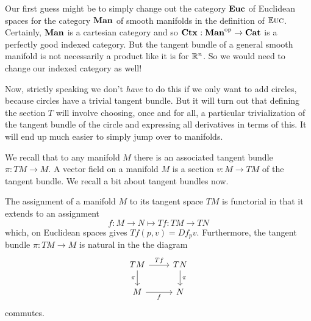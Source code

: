 \documentclass[DynamicalBook]{subfiles}
\begin{document}
Our first guess might be to simply change out the category $\textbf{Euc}$ of
Euclidean spaces for the category $\textbf{Man}$ of smooth manifolds in the
definition of $\mathbb{E}\textsc{uc}$. Certainly, $\textbf{Man}$ is a cartesian category and so
$\textbf{Ctx}_{} : \textbf{Man}^{\textnormal{op}} \to \textbf{Cat}$ is a perfectly good indexed category.
But the tangent bundle of a general smooth manifold is not necessarily a product
like it is for $\mathbb{R}^n$. So we would need to change our indexed category as well!

\iffalse
We could certainly do this, but if we only want to add circles then we can do
something less drastic. We can consider the cartesian category whose objects are
of the form $\rr^n \times T^m$, where $T^m = S^1 \times \cdots \times S^1$ is
the $m$-fold torus, and whose maps are smooth maps. Since the circle is
\emph{parallelizable}, which is to say that one can define a vector field on the
circle as a function in $\rr$, the tangent bundle of $\rr^n \times T^m$ is a
product of this space with $\rr^{n + m}$. 

\begin{definition}
  Let $\Cat{Tori}$ denote the category whose objects are $\rr^n \times T^m$ and
  smooth maps between them. We note that this is a cartesian category, with
  $$(\rr^n \times T^m) \times (\rr^k \times T^q) = \rr^{n + k} \times T^{m + q}.$$
\end{definition}

\begin{definition}
 The \emph{toric differential doctrine} consists of $\smctx{-} : \Cat{Tori}\op
 \to \Cat{Cat}$ together with the section $T$ given by $T(\rr^n \times T^m) =
 \rr^{n + m}$ and for $f : \rr^n \times T^m \to \rr^k \times T^q$, $Tf : (\rr^n
 \times T^m) \times \rr^{n + m} \to \rr^k \times T^q$ defined to be
 \[
Tf((p,t),(v, u)) \coloneqq ()
 \]
\end{definition}
\fi

Now, strictly speaking we don't \emph{have} to do this if we only want to add
circles, because circles have a trivial tangent bundle. But it will turn out
that defining the section $T$ will involve choosing, once and for all, a
particular trivialization of the tangent bundle of the circle and expressing all
derivatives in terms of this. It will end up much easier to simply jump over to manifolds.

We recall that to any manifold $M$ there is an associated tangent bundle $\pi :
TM \to M$. A vector field on a manifold $M$ is a section $v : M \to TM$ of the
tangent bundle. We recall a bit about tangent bundles now.
\begin{proposition}
The assignment of a manifold $M$ to its tangent space $TM$ is functorial in that
it extends to an assignment
\[
f : M \to N \mapsto Tf : TM \to TN
\]
which, on Euclidean spaces gives $Tf(p, v) = Df_p v$. Furthermore, the tangent
bundle $\pi : TM \to M$ is natural in the the diagram
\[
  \begin{tikzcd}
    TM \ar[d, "\pi"'] \ar[r, "Tf"]& TN \ar[d, "\pi"] \\
    M \ar[r, "f"'] & N
  \end{tikzcd}
\]
commutes.
\end{proposition}
\end{document}
